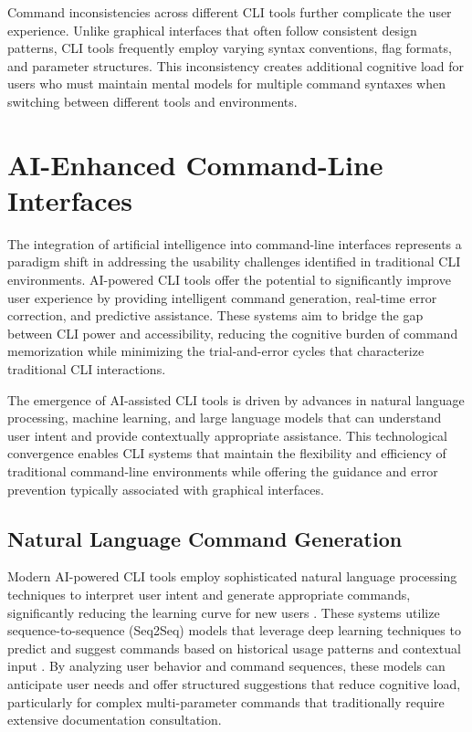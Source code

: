 Command inconsistencies across different CLI tools further complicate the user experience. Unlike graphical interfaces that often follow consistent design patterns, CLI tools frequently employ varying syntax conventions, flag formats, and parameter structures. This inconsistency creates additional cognitive load for users who must maintain mental models for multiple command syntaxes when switching between different tools and environments.

\section{AI-Enhanced Command-Line Interfaces}

The integration of artificial intelligence into command-line interfaces represents a paradigm shift in addressing the usability challenges identified in traditional CLI environments. AI-powered CLI tools offer the potential to significantly improve user experience by providing intelligent command generation, real-time error correction, and predictive assistance. These systems aim to bridge the gap between CLI power and accessibility, reducing the cognitive burden of command memorization while minimizing the trial-and-error cycles that characterize traditional CLI interactions.

The emergence of AI-assisted CLI tools is driven by advances in natural language processing, machine learning, and large language models that can understand user intent and provide contextually appropriate assistance. This technological convergence enables CLI systems that maintain the flexibility and efficiency of traditional command-line environments while offering the guidance and error prevention typically associated with graphical interfaces.

\subsection{Natural Language Command Generation}

Modern AI-powered CLI tools employ sophisticated natural language processing techniques to interpret user intent and generate appropriate commands, significantly reducing the learning curve for new users \cite{spinellis2023}. These systems utilize sequence-to-sequence (Seq2Seq) models that leverage deep learning techniques to predict and suggest commands based on historical usage patterns and contextual input \cite{singh2020}. By analyzing user behavior and command sequences, these models can anticipate user needs and offer structured suggestions that reduce cognitive load, particularly for complex multi-parameter commands that traditionally require extensive documentation consultation.

